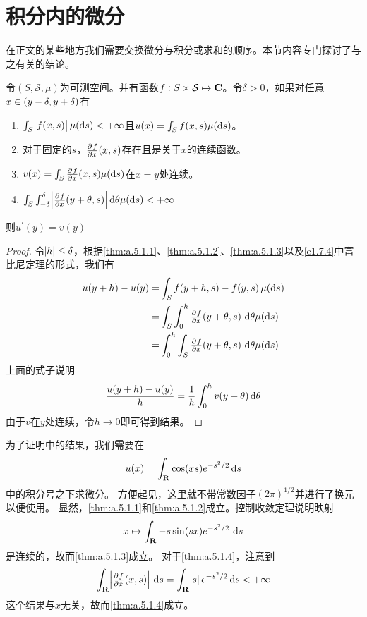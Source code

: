 \documentclass[main.tex]{subfiles}
\begin{document}
\section{积分内的微分} \label{sec:a.5}
在正文的某些地方我们需要交换微分与积分或求和的顺序。本节内容专门探讨了与之有关的结论。
\begin{theorem} \label{thm:a.5.1}
	令\((S, \mathcal{S}, \mu)\)为可测空间。并有函数\(f: S\times\mathcal{S}\mapsto \mathbf{C}\)。令\(\delta > 0\)，如果对任意\(x \in \intoo{y-\delta, y+\delta}\)有
	\begin{enumerate}
		\item\label{thm:a.5.1.1} \(\int_S\envert{f(x,s)} \mu(\dif s) < +\infty\)且\(u(x) = \int_S f(x,s) \mu(\dif s)\)。
		\item\label{thm:a.5.1.2} 对于固定的\(s\)，\(\pd{f}{x}(x,s)\)存在且是关于\(x\)的连续函数。
		\item\label{thm:a.5.1.3} \(v(x) = \int_S \pd{f}{x}(x,s) \mu(\dif s)\)在\(x=y\)处连续。
		\item\label{thm:a.5.1.4} \(\int_S\int_{-\delta}^{\delta}\envert{\pd{f}{x}(y+\theta, s)} \dif \theta \mu(\dif s) < +\infty\)
	\end{enumerate}
	则\(u^\prime(y) = v(y)\)
\end{theorem}
\begin{proof}
	令\(\envert{h} \leq \delta\)，根据\ref{thm:a.5.1.1}、\ref{thm:a.5.1.2}、\ref{thm:a.5.1.3}以及\ref{e1.7.4}中富比尼定理的形式，我们有
	\[\begin{split}
		u(y+h)-u(y)=&\int_S f(y+h, s)-f(y, s)\,\mu(\dif s)\\
		=&\int_S\int_0^h \pd{f}{x}(y+\theta, s)\,\dif \theta\mu(\dif s)\\
		=&\int_0^h\int_S \pd{f}{x}(y+\theta, s)\,\dif \theta\mu(\dif s)
	\end{split}\]
	上面的式子说明
	\[\frac{u(y+h)-u(y)}{h} = \frac{1}{h}\int_0^h v(y+\theta) \dif \theta\]
	由于\(v\)在\(y\)处连续，令\(h\rightarrow 0\)即可得到结果。
\end{proof}

\begin{example}
	为了证明中的结果，我们需要在
	\[u(x) = \int_\R \cos(xs)e^{-s^2/2} \dif s\]
	中的积分号之下求微分。
	方便起见，这里就不带常数因子\((2\pi)^{1/2}\)并进行了换元以便使用。
	显然，\ref{thm:a.5.1.1}和\ref{thm:a.5.1.2}成立。控制收敛定理说明映射
	\[x\mapsto \int_\R -s\sin(sx)e^{-s^2/2}\,\dif s\]
	是连续的，故而\ref{thm:a.5.1.3}成立。
	对于\ref{thm:a.5.1.4}，注意到
	\[\int_\R \envert{\pd{f}{x}(x, s)}\,\dif s = \int_\R\envert{s}e^{-s^2/2} \dif s < +\infty\]
	这个结果与\(x\)无关，故而\ref{thm:a.5.1.4}成立。
\end{example}
\end{document}

